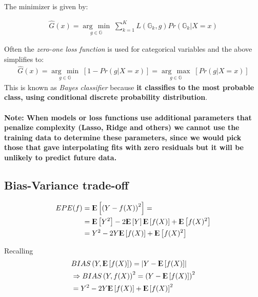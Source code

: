 \documentclass[12pt, letterpaper]{article}
\theoremstyle{definition}
\newcommand{\E}{{\rm I\kern-.3em E}}
\newcommand{\argmax}[1]{\underset{#1}{\operatorname{arg}\,\operatorname{max}}\;}
\newcommand{\argmin}[1]{\underset{#1}{\operatorname{arg}\,\operatorname{min}}\;}
\begin{document}
The minimizer is given by:

\begin{equation}
\begin{aligned}
\hat{G}(x) = \argmin{g \in \mathbb{G}} \sum_{k=1}^{K} L\left( \mathbb{G}_k, g\right)Pr\left( \mathbb{G}_k | X=x \right)
\end{aligned}
\end{equation}

Often the \textit{zero-one loss function} is used for categorical variables and the above simplifies to:
\begin{equation}
\begin{aligned}
\hat{G}(x) = \argmin{g \in \mathbb{G}}  \left[1 - Pr\left( g | X=x \right) \right] =\argmax{g \in \mathbb{G}}  \left[Pr\left( g | X=x \right) \right]
\end{aligned}
\end{equation}
This is known as \textit{Bayes classifier} because \textbf{it classifies to the most probable class, using conditional discrete probability distribution}.

\paragraph{\textbf{Note}: When models or loss functions use additional parameters that penalize complexity (Lasso, Ridge and others) we cannot use the training data to determine these parameters, since we would pick those that gave interpolating fits with zero residuals but it will be unlikely to predict future data.}

\subsection{Bias-Variance trade-off}
\begin{equation}
\begin{aligned}
EPE(f) &= \E \left[ \left( Y- f(X) \right)^2 \right] =\\
            &= \E \left[ Y^2\right] - 2 \E \left[ Y\right] \E\left[ f(X)\right] + \E\left[ f(X)^2\right]\\
             &= Y^2 - 2  Y \E\left[ f(X)\right] + \E\left[ f(X)^2\right]
\end{aligned}
\end{equation}

Recalling 
\begin{equation}
\begin{aligned}
&BIAS\left(Y,\E\left[f(X)\right]\right) = \left| Y-\E\left[f(X)\right]\right| \\
&\Rightarrow BIAS\left(Y,f(X)\right)^2 = \left( Y-\E\left[f(X)\right]\right)^2 \\
&= Y^2 -2 Y \E\left[f(X)\right] + \E\left[f(X)\right]^2 \\
\end{aligned}
\end{equation}
\end{document}
